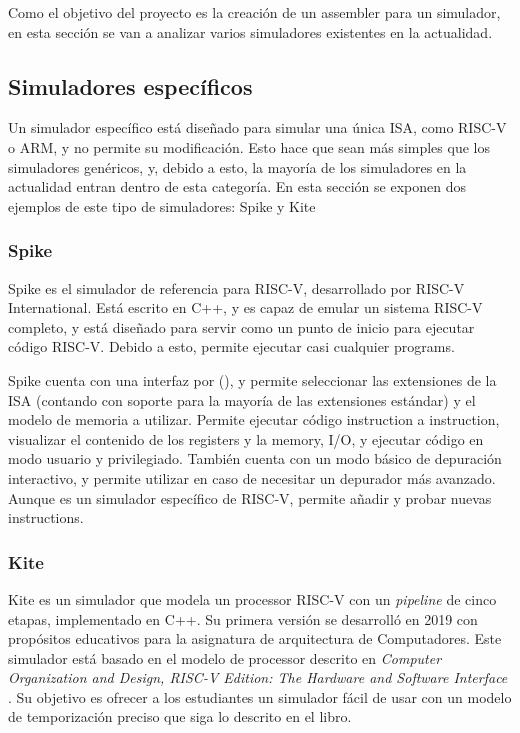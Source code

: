 Como el objetivo del proyecto es la creación de un \gls{assembler} para un
simulador, en esta sección se van a analizar varios simuladores existentes en la
actualidad.

\subsection{Simuladores específicos}

Un simulador específico está diseñado para simular una única \gls{ISA}, como
RISC-V o ARM, y no permite su modificación. Esto hace que sean más simples que
los simuladores genéricos, y, debido a esto, la mayoría de los simuladores en la
actualidad entran dentro de esta categoría. En esta sección se exponen dos
ejemplos de este tipo de simuladores: Spike y Kite

\subsubsection{Spike}

Spike \parencite{spike} es el simulador de referencia para RISC-V, desarrollado
por RISC-V International. Está escrito en C++, y es capaz de emular un sistema RISC-V completo, y está
diseñado para servir como un punto de inicio para ejecutar código RISC-V. Debido
a esto, permite ejecutar casi cualquier \glspl{program}.

Spike cuenta con una interfaz por 
(), y permite seleccionar las extensiones de la \gls{ISA}
(contando con soporte para la mayoría de las extensiones estándar) y el modelo
de memoria a utilizar. Permite ejecutar código \gls{instruction} a
\gls{instruction}, visualizar el contenido de los \glspl{register} y la
\gls{memory}, I/O, y ejecutar código en modo usuario y privilegiado. También cuenta
con un modo básico de depuración interactivo, y permite utilizar 
en caso de necesitar un depurador más avanzado. Aunque es un simulador
específico de RISC-V, permite añadir y probar nuevas \glspl{instruction}.


\subsubsection{Kite}

Kite \parencite{kite} \parencite{kite-gh} es un simulador que modela un
\gls{processor} RISC-V con un \textit{pipeline} de cinco etapas, implementado en
C++. Su primera versión se desarrolló en 2019 con propósitos educativos para la
asignatura de arquitectura de Computadores. Este simulador está basado en el
modelo de \gls{processor} descrito en \textit{Computer Organization and Design,
RISC-V Edition: The Hardware and Software Interface} \parencite{kite-book}. Su
objetivo es ofrecer a los estudiantes un simulador fácil de usar con un modelo
de temporización preciso que siga lo descrito en el libro.

